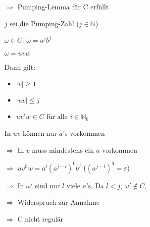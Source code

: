 \documentclass{bschlangaul-aufgabe}
\begin{document}
\begin{bAntwort}
$\Rightarrow$ Pumping-Lemma für C erfüllt

$j$ sei die Pumping-Zahl ($j \in \mathbb{N}$)

$\omega \in C$: $\omega = a^j b^j$

$\omega = u v w$

Dann gilt:

\begin{itemize}
\item $|v| \geq 1$
\item $|uv| \leq j$
\item $u v^i w \in C$ für alle $i \in \mathbb{N}_0$
\end{itemize}

In $uv$ können nur $a$’s vorkommen

$\Rightarrow$
In $v$ muss mindestens ein $a$ vorkommen

$\Rightarrow$
$u v^0 w = a^l (a^{j-l})^0 b^j$ ($(a^{j-l})^0 = \varepsilon$)

$\Rightarrow$
In $\omega'$ sind nur $l$ viele $a$’s, Da $l < j$, $\omega' \notin C$,

$\Rightarrow$
Widerspruch zur Annahme

$\Rightarrow$
C nicht regulär
\end{bAntwort}
\end{document}
